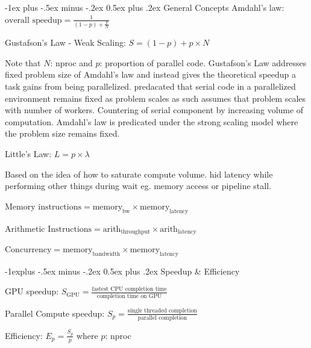 \documentclass[letter,8pt,landscape]{article}
\makeatletter
\renewcommand{\section}{\@startsection{section}{1}{0mm}%
                                {-1ex plus -.5ex minus -.2ex}%
                                {0.5ex plus .2ex}%
                                {\normalfont\large\bfseries}}
\renewcommand{\subsection}{\@startsection{subsection}{2}{0mm}%
                                {-1explus -.5ex minus -.2ex}%
                                {0.5ex plus .2ex}%
                                {\normalfont\normalsize\bfseries}}
\makeatother
\begin{document}
\raggedright
\footnotesize

\begin{multicols}{3}
\setlength{\premulticols}{1pt}
\setlength{\postmulticols}{1pt}
\setlength{\multicolsep}{1pt}
\setlength{\columnsep}{2pt}

\vfill
\smallskip

  \section{General Concepts}
  Amdahl's law: $\text{overall speedup} = \frac{1}{(1-p) +
  \frac{p}{N}}$

  Gustafson's Law - Weak Scaling: $S = (1-p) + p \times N$

  Note that $N$: nproc and $p$: proportion of parallel code. Gustafson's Law
  addresses fixed problem size of Amdahl's law and instead gives the theoretical
  speedup a task gains from being parallelized. predacated that serial code in a
  parallelized environment remains fixed as problem scales as such assumes that
  problem scales with number of workers. Countering of serial component by
  increasing volume of computation. Amdahl's law is predicated under the strong
  scaling model where the problem size remains fixed.

  Little's Law: $L = p \times \lambda$
  
  Based on the idea of how to saturate compute volume. hid latency while
  performing other things during wait eg. memory access or pipeline stall.

  $\text{Memory instructions} = \text{memory}_\text{bw} \times \text{memory}_\text{latency}$

  $\text{Arithmetic Instructions} = \text{arith}_\text{throughput} \times \text{arith}_\text{latency}$

  $\text{Concurrency} = \text{memory}_\text{bandwidth} \times \text{memory}_\text{latency}$

  \subsection{Speedup \& Efficiency}

  GPU speedup: $S_\text{GPU} = \frac{\text{fastest CPU completion
  time}}{\text{completion time on GPU}}$

  Parallel Compute speedup: $S_p = \frac{\text{single threaded
  completion}}{\text{parallel completion}}$

  Efficiency: $E_p = \frac{S_p}{p}$ where $p$: nproc



\end{multicols}
\end{document}
